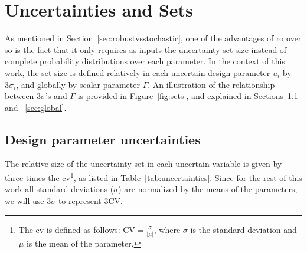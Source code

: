 \section{Uncertainties and Sets}
\label{uncertainties_and_sets}

As mentioned in Section~\ref{sec:robustvsstochastic}, one of the advantages
of \gls{ro} over \gls{so} is the fact that it only requires as inputs
the uncertainty set size instead of complete probability distributions
over each parameter.
In the context of this work, the set size is defined relatively in each
uncertain design parameter $u_i$ by $3\sigma_i$, and globally by scalar parameter
$\Gamma$. An illustration of the relationship between $3\sigma$'s and $\Gamma$
is provided in Figure~\ref{fig:sets}, and explained in Sections~\ref{sec:relative} and ~\ref{sec:global}.

\subsection{Design parameter uncertainties}
\label{sec:relative}

The relative size of the uncertainty set in each uncertain variable is
given by three times the \gls{cv}\footnote{The \gls{cv}
is defined as follows: $\text{CV} = \frac{\sigma}{|\mu|}$,
where $\sigma$ is the standard deviation and $\mu$ is the mean of the parameter.},
as listed in Table~\ref{tab:uncertainties}. Since for the rest of this work
all standard deviations ($\sigma$) are normalized by the means of the parameters, we will use $3\sigma$
to represent $3\text{CV}$.

